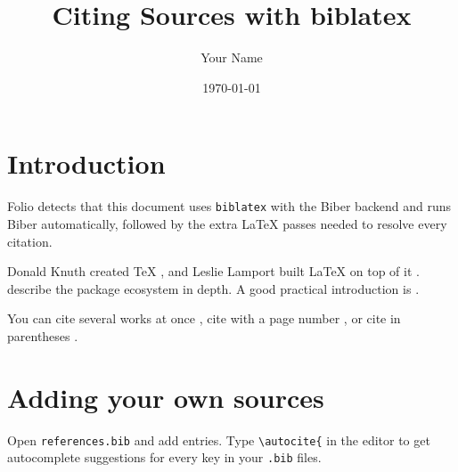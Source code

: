 \documentclass[11pt,a4paper]{article}
\title{Citing Sources with biblatex}
\author{Your Name}
\date{\today}
\begin{document}
\maketitle

\section{Introduction}
Folio detects that this document uses \texttt{biblatex} with the Biber
backend and runs Biber automatically, followed by the extra LaTeX passes
needed to resolve every citation.

Donald Knuth created \TeX{} \autocite{knuth1984}, and Leslie Lamport built
\LaTeX{} on top of it \autocite{lamport1994}. \textcite{mittelbach2004}
describe the package ecosystem in depth. A good practical introduction is
 \autocite{oetiker2023}.

You can cite several works at once \autocite{knuth1984,lamport1994}, cite
with a page number \autocite[42]{knuth1984}, or cite in parentheses
\parencite{tantau2023}.

\section{Adding your own sources}
Open \texttt{references.bib} and add entries. Type \verb|\autocite{| in the
editor to get autocomplete suggestions for every key in your \texttt{.bib}
files.

\printbibliography
\end{document}
